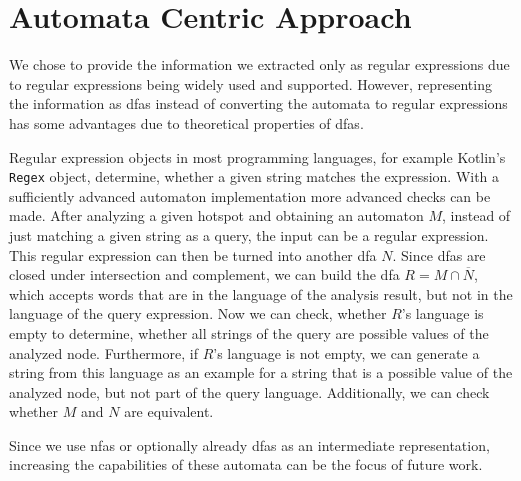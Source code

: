 \section{Automata Centric Approach}

We chose to provide the information we extracted only as regular expressions due to regular expressions being widely used and supported.
However, representing the information as \acp{dfa} instead of converting the automata to regular expressions has some advantages due to theoretical properties of \acp{dfa}.

Regular expression objects in most programming languages, for example Kotlin's \lstinline|Regex| object, determine, whether a given string matches the expression. With a sufficiently advanced automaton implementation more advanced checks can be made.
After analyzing a given hotspot and obtaining an automaton $M$, instead of just matching a given string as a query, the input can be a regular expression. This regular expression can then be turned into another \ac{dfa} $N$.
Since \acp{dfa} are closed under intersection and complement, we can build the \ac{dfa} $R = M \cap \overline{N}$, which accepts words that are in the language of the analysis result, but not in the language of the query expression.
Now we can check, whether $R$'s language is empty to determine, whether all strings of the query are possible values of the analyzed node. Furthermore, if $R$'s language is not empty, we can generate a string from this language as an example for a string that is a possible value of the analyzed node, but not part of the query language.
Additionally, we can check whether $M$ and $N$ are equivalent.

Since we use \acp{nfa} or optionally already \acp{dfa} as an intermediate representation, increasing the capabilities of these automata can be the focus of future work.
\begin{comment}
\begin{itemize}
\item How did you test/evaluate your PoC?
    \begin{itemize}
    \item E.g. case studies, large-scale studies, test bench, etc.
    \item What did you do to verify results (if applicable)
    \end{itemize}
\item What did you learn from these tests? Depends on your work. E.g.
    \begin{itemize}
    \item TP/TN/FP/FN rates
    \item Performance
    \item Results of your studies
    \item Interpretation of the results, lessons learned
    \end{itemize}
\item Limitations of the approach and your implementation. Any ideas on how to fix them?
\end{itemize}

Probably 5-15 pages
\end{comment}